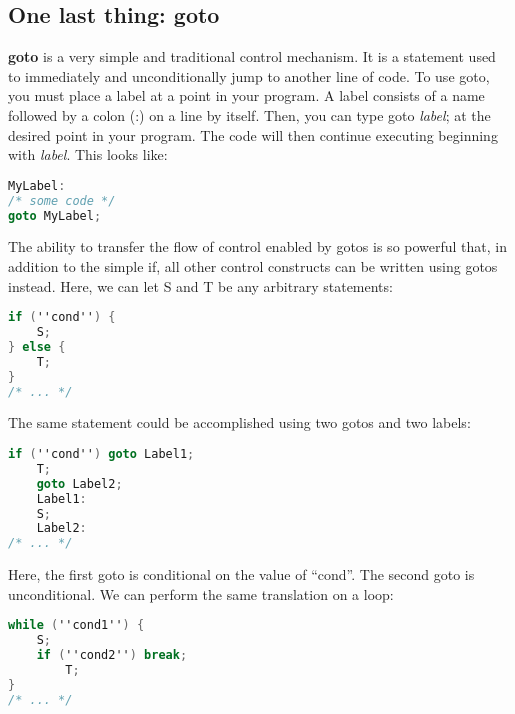 \subsection{One last thing: goto}
\textbf{goto} is a very simple and traditional control mechanism. It is a
statement used to immediately and unconditionally jump to another line of code.
To use goto, you must place a label at a point in your program. A label
consists of a name followed by a colon (:) on a line by itself. Then, you can
type goto \emph{label}; at the desired point in your program. The code will
then continue executing beginning with \emph{label}. This looks like:
\lstset{basicstyle=\scriptsize, numbers=left, captionpos=b, tabsize=4}
\begin{lstlisting}[caption=Section \thesection listing \arabic{controlcnt},language={C},
breaklines=true,xleftmargin=15pt, label=lst:section\thesection listing\arabic{controlcnt}]
MyLabel:
/* some code */
goto MyLabel;
\end{lstlisting}

The ability to transfer the flow of control enabled by gotos is so powerful
that, in addition to the simple if, all other control constructs can be written
using gotos instead. Here, we can let S and T be any arbitrary
statements:
\lstset{basicstyle=\scriptsize, numbers=left, captionpos=b, tabsize=4}
\begin{lstlisting}[caption=Section \thesection listing \arabic{controlcnt},language={C},
breaklines=true,xleftmargin=15pt, label=lst:section\thesection listing\arabic{controlcnt}]
if (''cond'') {
	S;
} else {
	T;
}
/* ... */
\end{lstlisting}

The same statement could be accomplished using two gotos and two labels:
\lstset{basicstyle=\scriptsize, numbers=left, captionpos=b, tabsize=4}
\begin{lstlisting}[caption=Section \thesection listing \arabic{controlcnt},language={C},
breaklines=true,xleftmargin=15pt, label=lst:section\thesection listing\arabic{controlcnt}]
if (''cond'') goto Label1;
	T;
	goto Label2;
	Label1:
	S;
	Label2:
/* ... */
\end{lstlisting}

Here, the first goto is conditional on the value of ``cond''. The second goto
is unconditional. We can perform the same translation on a loop:
\lstset{basicstyle=\scriptsize, numbers=left, captionpos=b, tabsize=4}
\begin{lstlisting}[caption=Section \thesection listing \arabic{controlcnt},language={C},
breaklines=true,xleftmargin=15pt, label=lst:section\thesection listing\arabic{controlcnt}]
while (''cond1'') {
	S;
	if (''cond2'') break;
		T;
}
/* ... */
\end{lstlisting}

